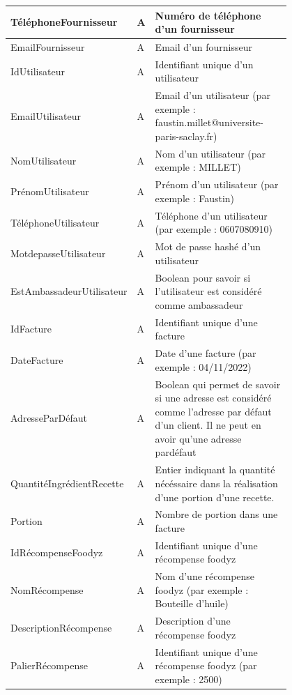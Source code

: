 \documentclass{article}
\begin{document}
\begin{center}
\begin{longtable}{|p{0.25\linewidth}|p{0.05\linewidth}|p{0.50\linewidth}|}
        \hline 
        TéléphoneFournisseur & A & Numéro de téléphone d'un fournisseur \\
        \hline 
        EmailFournisseur & A & Email d'un fournisseur \\
        \hline 
        IdUtilisateur & A & Identifiant unique d'un utilisateur \\
        \hline 
        EmailUtilisateur & A & Email d'un utilisateur (par exemple : faustin.millet@universite-paris-saclay.fr) \\
        \hline 
        NomUtilisateur & A & Nom d'un utilisateur (par exemple : MILLET) \\
        \hline 
        PrénomUtilisateur & A & Prénom d'un utilisateur (par exemple : Faustin) \\
        \hline 
        TéléphoneUtilisateur & A & Téléphone d'un utilisateur (par exemple : 0607080910) \\
        \hline 
        MotdepasseUtilisateur & A & Mot de passe hashé d'un utilisateur \\
        \hline 
        EstAmbassadeurUtilisateur & A & Boolean pour savoir si l'utilisateur est considéré comme ambassadeur \\
        \hline 
        IdFacture & A & Identifiant unique d'une facture \\
        \hline 
        DateFacture & A & Date d'une facture (par exemple : 04/11/2022) \\
        \hline 
        AdresseParDéfaut & A & Boolean qui permet de savoir si une adresse est considéré comme l'adresse par défaut d'un client. Il ne peut en avoir qu'une adresse pardéfaut \\
        \hline 
        QuantitéIngrédientRecette & A & Entier indiquant la quantité nécéssaire dans la réalisation d'une portion d'une recette. \\
        \hline 
        Portion & A & Nombre de portion dans une facture \\
        \hline
        IdRécompenseFoodyz & A & Identifiant unique d'une récompense foodyz \\
        \hline
        NomRécompense & A & Nom d'une récompense foodyz (par exemple : Bouteille d'huile) \\
        \hline
        DescriptionRécompense & A & Description d'une récompense foodyz \\
        \hline
        PalierRécompense & A & Identifiant unique d'une récompense foodyz (par exemple : 2500) \\

\end{longtable}
\end{center}
\end{document}
